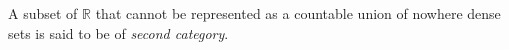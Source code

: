 A subset of $\mathbb{R}$ that cannot be represented as a countable union of nowhere dense sets is said to be of \textit{second category}.

